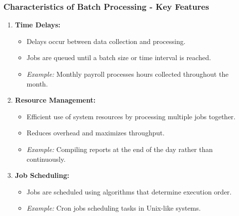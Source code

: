 \documentclass{beamer}
\begin{document}
\begin{frame}[fragile]
    \frametitle{Characteristics of Batch Processing - Key Features}
    \begin{enumerate}
        \item \textbf{Time Delays:}
            \begin{itemize}
                \item Delays occur between data collection and processing.
                \item Jobs are queued until a batch size or time interval is reached.
                \item \textit{Example:} Monthly payroll processes hours collected throughout the month.
            \end{itemize}
        
        \item \textbf{Resource Management:}
            \begin{itemize}
                \item Efficient use of system resources by processing multiple jobs together.
                \item Reduces overhead and maximizes throughput.
                \item \textit{Example:} Compiling reports at the end of the day rather than continuously.
            \end{itemize}
        
        \item \textbf{Job Scheduling:}
            \begin{itemize}
                \item Jobs are scheduled using algorithms that determine execution order.
                \item \textit{Example:} Cron jobs scheduling tasks in Unix-like systems.
            \end{itemize}
    \end{enumerate}
\end{frame}
\end{document}
